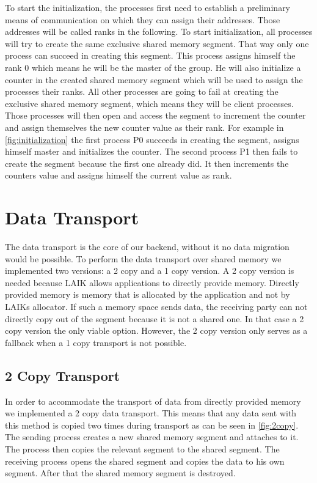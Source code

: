 To start the initialization, the processes first need to establish a preliminary means of communication on which they can assign their addresses.
Those addresses will be called ranks in the following.
To start initialization, all processes will try to create the same exclusive shared memory segment.
That way only one process can succeed in creating this segment.
This process assigns himself the rank $0$ which means he will be the master of the group.
He will also initialize a counter in the created shared memory segment which will be used to assign the processes their ranks.
All other processes are going to fail at creating the exclusive shared memory segment, which means they will be client processes.
Those processes will then open and access the segment to increment the counter and assign themselves the new counter value as their rank.
For example in \autoref{fig:initialization} the first process P0 succeeds in creating the segment, assigns himself master and initializes the counter.
The second process P1 then fails to create the segment because the first one already did.
It then increments the counters value and assigns himself the current value as rank.

\section{Data Transport}\label{section:design_data_transport}

The data transport is the core of our backend, without it no data migration would be possible.
To perform the data transport over shared memory we implemented two versions: a 2 copy and a 1 copy version.
A 2 copy version is needed because LAIK allows applications to directly provide memory.
Directly provided memory is memory that is allocated by the application and not by LAIKs allocator.
If such a memory space sends data, the receiving party can not directly copy out of the segment because it is not a shared one.
In that case a 2 copy version the only viable option.
However, the 2 copy version only serves as a fallback when a 1 copy transport is not possible.

\subsection{2 Copy Transport}

In order to accommodate the transport of data from directly provided memory we implemented a 2 copy data transport. 
This means that any data sent with this method is copied two times during transport as can be seen in \autoref{fig:2copy}. 
The sending process creates a new shared memory segment and attaches to it. 
The process then copies the relevant segment to the shared segment. 
The receiving process opens the shared segment and copies the data to his own segment.
After that the shared memory segment is destroyed.


